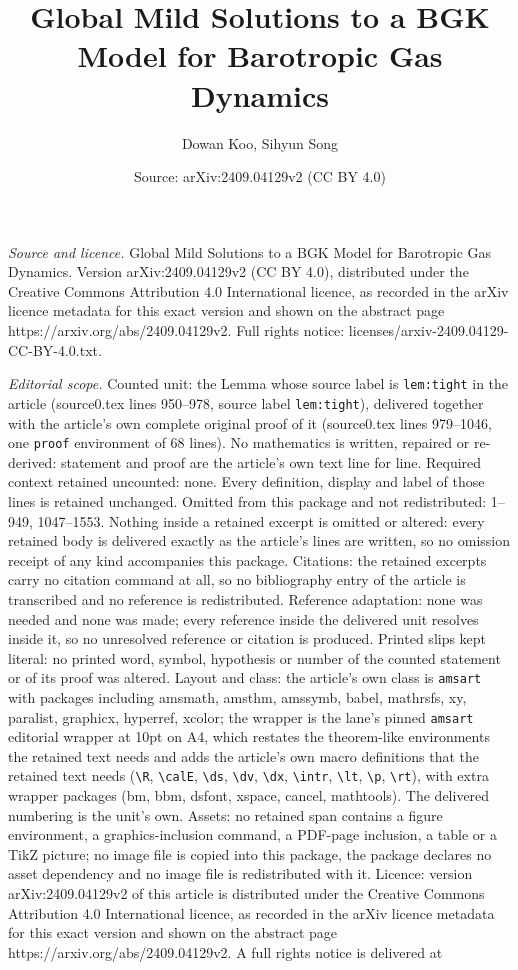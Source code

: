 \documentclass[10pt,a4paper]{amsart}
\title[Global Mild Solutions to a BGK Model for Barotropic Gas Dyna]{Global Mild Solutions to a BGK Model for Barotropic Gas Dynamics}
\author{Dowan Koo, Sihyun Song}
\date{Source: arXiv:2409.04129v2 (CC BY 4.0)}
\begin{document}
\maketitle

\noindent\emph{Source and licence.} Global Mild Solutions to a BGK Model for Barotropic Gas Dynamics. Version arXiv:2409.04129v2 (CC BY 4.0), distributed under the Creative Commons Attribution 4.0 International licence, as recorded in the arXiv licence metadata for this exact version and shown on the abstract page https://arxiv.org/abs/2409.04129v2. Full rights notice: licenses/arxiv-2409.04129-CC-BY-4.0.txt.\par\smallskip

\noindent\textit{Editorial scope.} Counted unit: the Lemma whose source label is \texttt{lem:tight} in the article (source0.tex lines 950--978, source label \texttt{lem:tight}), delivered together with the article's own complete original proof of it (source0.tex lines 979--1046, one \texttt{proof} environment of 68 lines). No mathematics is written, repaired or re-derived: statement and proof are the article's own text line for line. Required context retained uncounted: none. Every definition, display and label of those lines is retained unchanged. Omitted from this package and not redistributed: 1--949, 1047--1553. Nothing inside a retained excerpt is omitted or altered: every retained body is delivered exactly as the article's lines are written, so no omission receipt of any kind accompanies this package. Citations: the retained excerpts carry no citation command at all, so no bibliography entry of the article is transcribed and no reference is redistributed. Reference adaptation: none was needed and none was made; every reference inside the delivered unit resolves inside it, so no unresolved reference or citation is produced. Printed slips kept literal: no printed word, symbol, hypothesis or number of the counted statement or of its proof was altered. Layout and class: the article's own class is \texttt{amsart} with packages including amsmath, amsthm, amssymb, babel, mathrsfs, xy, paralist, graphicx, hyperref, xcolor; the wrapper is the lane's pinned \texttt{amsart} editorial wrapper at 10pt on A4, which restates the theorem-like environments the retained text needs and adds the article's own macro definitions that the retained text needs (\texttt{\textbackslash R}, \texttt{\textbackslash calE}, \texttt{\textbackslash ds}, \texttt{\textbackslash dv}, \texttt{\textbackslash dx}, \texttt{\textbackslash intr}, \texttt{\textbackslash lt}, \texttt{\textbackslash p}, \texttt{\textbackslash rt}), with extra wrapper packages (bm, bbm, dsfont, xspace, cancel, mathtools). The delivered numbering is the unit's own. Assets: no retained span contains a figure environment, a graphics-inclusion command, a PDF-page inclusion, a table or a TikZ picture; no image file is copied into this package, the package declares no asset dependency and no image file is redistributed with it. Licence: version arXiv:2409.04129v2 of this article is distributed under the Creative Commons Attribution 4.0 International licence, as recorded in the arXiv licence metadata for this exact version and shown on the abstract page https://arxiv.org/abs/2409.04129v2. A full rights notice is delivered at 
\end{document}
